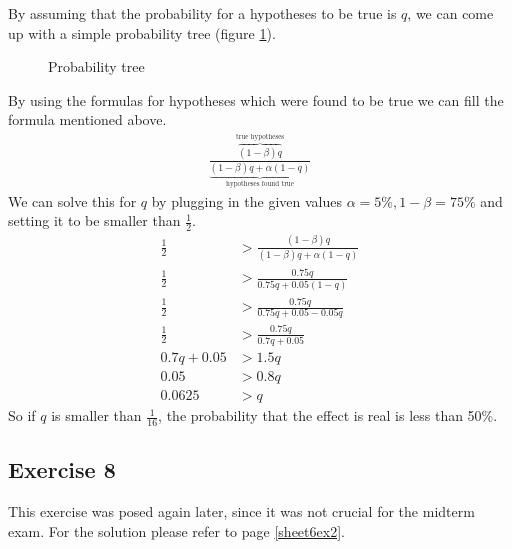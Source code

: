 \documentclass[../main/Notes.tex]{subfiles}
\begin{document}
By assuming that the probability for a hypotheses to be true is $q$, we can come up with a simple probability tree (figure \ref{fig:2014-05-30_ex6tree}).

\begin{figure}[!ht]
  
  \caption{Probability tree}
  \label{fig:2014-05-30_ex6tree}
\end{figure}

By using the formulas for hypotheses which were found to be true we can fill the formula mentioned above.
\begin{align*}
\frac{\overbrace{(1-\beta)q}^\text{true hypotheses}}{\underbrace{(1-\beta)q+\alpha(1-q)}_\text{hypotheses found true}}
\end{align*}
We can solve this for $q$ by plugging in the given values $\alpha=5\%,1-\beta=75\%$ and setting it to be smaller than $\frac{1}{2}$.
\begin{align*}
\frac{1}{2}&>\frac{(1-\beta)q}{(1-\beta)q+\alpha(1-q)} \\
\frac{1}{2}&>\frac{0.75q}{0.75q+0.05(1-q)} \\
\frac{1}{2}&>\frac{0.75q}{0.75q+0.05-0.05q} \\
\frac{1}{2}&>\frac{0.75q}{0.7q+0.05} \\
0.7q+0.05  &>1.5q \\
0.05       &>0.8q \\
0.0625     &>q
\end{align*}
So if $q$ is smaller than $\frac{1}{16}$, the probability that the effect is real is less than 50\%.


\subsection*{Exercise 8}
This exercise was posed again later, since it was not crucial for the midterm exam. For the solution please refer to page \ref{sheet6ex2}.
\end{document}
